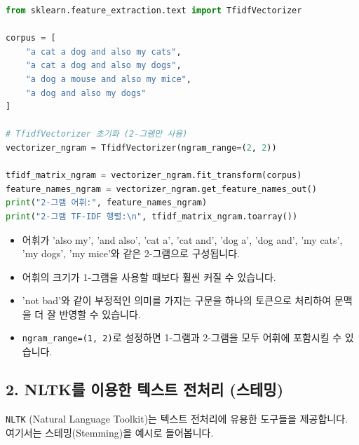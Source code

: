 \documentclass[11pt,a4paper]{article}
\theoremstyle{definition}
\begin{document}
\begin{examplebox}[title=📖 2-그램 적용 코드 예시]
\begin{lstlisting}[language=Python, caption=2-그램 TF-IDF 벡터화 예시, label=lst:tfidf_ngram]
from sklearn.feature_extraction.text import TfidfVectorizer

corpus = [
    "a cat a dog and also my cats",
    "a cat a dog and also my dogs",
    "a dog a mouse and also my mice",
    "a dog and also my dogs"
]

# TfidfVectorizer 초기화 (2-그램만 사용)
vectorizer_ngram = TfidfVectorizer(ngram_range=(2, 2))

tfidf_matrix_ngram = vectorizer_ngram.fit_transform(corpus)
feature_names_ngram = vectorizer_ngram.get_feature_names_out()
print("2-그램 어휘:", feature_names_ngram)
print("2-그램 TF-IDF 행렬:\n", tfidf_matrix_ngram.toarray())
\end{lstlisting}
\end{examplebox}

\begin{tcolorbox}[summarybox, title=코드 실행 결과 분석]
\begin{itemize}
    \item 어휘가 'also my', 'and also', 'cat a', 'cat and', 'dog a', 'dog and', 'my cats', 'my dogs', 'my mice'와 같은 2-그램으로 구성됩니다.
    \item 어휘의 크기가 1-그램을 사용할 때보다 훨씬 커질 수 있습니다.
    \item 'not bad'와 같이 부정적인 의미를 가지는 구문을 하나의 토큰으로 처리하여 문맥을 더 잘 반영할 수 있습니다.
    \item \texttt{ngram\_range=(1, 2)}로 설정하면 1-그램과 2-그램을 모두 어휘에 포함시킬 수 있습니다.
\end{itemize}
\end{tcolorbox}

\subsection{2. NLTK를 이용한 텍스트 전처리 (스테밍)}
\texttt{NLTK} (Natural Language Toolkit)는 텍스트 전처리에 유용한 도구들을 제공합니다. 여기서는 스테밍(Stemming)을 예시로 들어봅니다.
\end{document}
